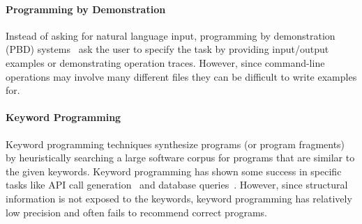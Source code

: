 \paragraph{Programming by Demonstration} Instead of asking for natural language input, programming by demonstration (PBD) systems~\cite{DBLP:journals/ml/LauWDW03, DBLP:journals/cacm/GulwaniHS12, DBLP:conf/pldi/HarrisG11, DBLP:conf/popl/Gulwani11} ask the user to specify the task by providing input/output examples or demonstrating operation traces. However, since command-line operations may involve many different files they can be difficult to write examples for.

\paragraph{Keyword Programming} Keyword programming techniques synthesize programs (or program fragments) by heuristically searching a large software corpus for programs that are similar to the given keywords. Keyword programming has shown some success in specific tasks like API call generation~\cite{DBLP:journals/ase/LittleM09, DBLP:conf/pldi/MandelinXBK05} and database queries~\cite{DBLP:conf/icde/AgrawalCD02, DBLP:conf/icde/BhalotiaHNCS02}. However, since structural information is not exposed to the keywords, keyword programming has relatively low precision and often fails to recommend correct programs.